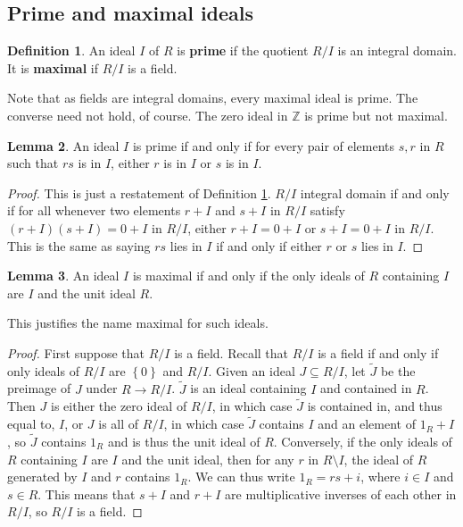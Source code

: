 \documentclass{article}
\newcommand{\Z}{\mathbb{Z}}
\newcommand{\rb}[1]{\left( #1 \right)}
\newcommand{\cb}[1]{\left\{ #1 \right\}}
\theoremstyle{definition}\newtheorem{definition}{Definition}[subsection]
\theoremstyle{definition}\newtheorem{remark}[definition]{Remark}
\theoremstyle{definition}\newtheorem*{example}{Example}
\theoremstyle{definition}\newtheorem*{note}{Note}
\newtheorem{lemma}[definition]{Lemma}
\begin{document}

\subsection{Prime and maximal ideals}

\begin{definition}
\label{def:2.6.1}
An ideal $ I $ of $ R $ is \textbf{prime} if the quotient $ R / I $ is an integral domain. It is \textbf{maximal} if $ R / I $ is a field.
\end{definition}

Note that as fields are integral domains, every maximal ideal is prime. The converse need not hold, of course. The zero ideal in $ \Z $ is prime but not maximal.

\begin{lemma}
An ideal $ I $ is prime if and only if for every pair of elements $ s, r $ in $ R $ such that $ rs $ is in $ I $, either $ r $ is in $ I $ or $ s $ is in $ I $.
\end{lemma}

\begin{proof}
This is just a restatement of Definition \ref{def:2.6.1}. $ R / I $ integral domain if and only if for all whenever two elements $ r + I $ and $ s + I $ in $ R / I $ satisfy $ \rb{r + I}\rb{s + I} = 0 + I $ in $ R / I $, either $ r + I = 0 + I $ or $ s + I = 0 + I $ in $ R / I $. This is the same as saying $ rs $ lies in $ I $ if and only if either $ r $ or $ s $ lies in $ I $.
\end{proof}

\begin{lemma}
An ideal $ I $ is maximal if and only if the only ideals of $ R $ containing $ I $ are $ I $ and the unit ideal $ R $.
\end{lemma}

This justifies the name maximal for such ideals.

\begin{proof}
First suppose that $ R / I $ is a field. Recall that $ R / I $ is a field if and only if only ideals of $ R / I $ are $ \cb{0} $ and $ R / I $. Given an ideal $ J \subseteq R / I $, let $ \widetilde{J} $ be the preimage of $ J $ under $ R \to R / I $. $ \widetilde{J} $ is an ideal containing $ I $ and contained in $ R $. Then $ J $ is either the zero ideal of $ R / I $, in which case $ \widetilde{J} $ is contained in, and thus equal to, $ I $, or $ J $ is all of $ R / I $, in which case $ \widetilde{J} $ contains $ I $ and an element of $ 1_R + I $, so $ \widetilde{J} $ contains $ 1_R $ and is thus the unit ideal of $ R $. Conversely, if the only ideals of $ R $ containing $ I $ are $ I $ and the unit ideal, then for any $ r $ in $ R \setminus I $, the ideal of $ R $ generated by $ I $ and $ r $ contains $ 1_R $. We can thus write $ 1_R = rs + i $, where $ i \in I $ and $ s \in R $. This means that $ s + I $ and $ r + I $ are multiplicative inverses of each other in $ R / I $, so $ R / I $ is a field.
\end{proof}
\end{document}
